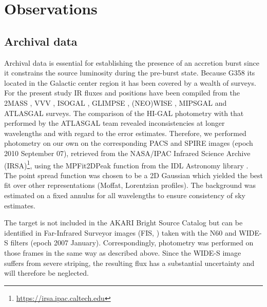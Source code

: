 \section{Observations}\label{obs}
\subsection{Archival data}\label{arch}
Archival data is essential for establishing the presence of an accretion burst since it constrains the source luminosity during the pre-burst state. Because G358 its located in the Galactic center region it has been covered by a wealth of surveys. For the present study IR fluxes and positions have been compiled from the 2MASS \citep{2003yCat.2246....0C},
VVV \citep{2010NewA...15..433M},
ISOGAL \citep{2003A&A...403..975O},
GLIMPSE \citep{2009yCat.2293....0S},
(NEO)WISE \citep{2014ApJ...792...30M},
MIPSGAL \citep{2015AJ....149...64G} and
ATLASGAL \citep{2009A&A...504..415S} surveys. 
The comparison of the HI-GAL photometry \citep{2016yCat..35910149M} with that performed by the ATLASGAL team \citep{2013A&A...549A..45C} revealed
inconsistencies
at longer wavelengths and with regard to the error estimates. Therefore, we
performed photometry on our own on the corresponding PACS and SPIRE images  (epoch 2010 September 07), retrieved from the NASA/IPAC Infrared Science Archive (IRSA)\footnote{\url{https://irsa.ipac.caltech.edu}}, using the MPFit2DPeak function from the IDL Astronomy library \citep{1995ASPC...77..437L}. The point spread function was chosen to be a 2D Gaussian which yielded the best fit over other representations (Moffat, Lorentzian profiles). The background was estimated on a fixed annulus for all wavelengths to ensure consistency of sky estimates.

The target is not included in the AKARI Bright Source Catalog \citep{2010yCat.2298....0Y} but can be identified in Far-Infrared Surveyor images (FIS, \citealp{2015PASJ...67...50D}) taken with the N60 and WIDE-S filters (epoch
2007 January). Correspondingly, photometry was performed on those frames in the same way as described above. Since the WIDE-S image suffers from severe striping, the resulting flux has a substantial uncertainty and will therefore be
neglected.

